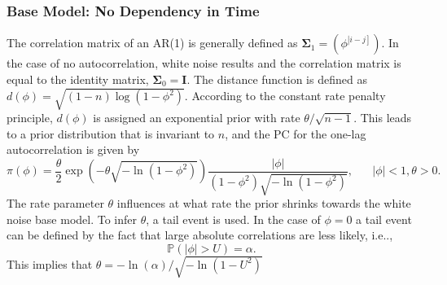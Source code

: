 \subsubsection*{Base Model: No Dependency in Time} 
The correlation matrix of an AR(1) is generally defined as $\pmb{\Sigma}_1=\left(\phi^{\left|i-j\right]}\right)$. In the case of no autocorrelation, white noise results and the correlation matrix is equal to the identity matrix, $\pmb{\Sigma}_0=\pmb{I}$. The distance function is defined as $d\left(\phi\right)=\sqrt{\left(1-n\right)\log\left(1-\phi^2\right)}$. According to the constant rate penalty principle, $d\left(\phi\right)$ is assigned an exponential prior with rate $\theta/\sqrt{n-1}$. This leads to a prior distribution that is invariant to $n$, and the PC for the one-lag autocorrelation is given by
\begin{equation}
    \pi\left(\phi\right)=\frac{\theta}{2}\exp\left(-\theta\sqrt{-\ln\left(1-\phi^2\right)}\right)\frac{|\phi|}{\left(1-\phi^2\right)\sqrt{-\ln\left(1-\phi^2\right)}}, \hspace{20pt} |\phi|<1,\theta>0.
\end{equation}
The rate parameter $\theta$ influences at what rate the prior shrinks towards the white noise base model. To infer $\theta$, a tail event is used. In the case of $\phi = 0$ a tail event can be defined by the fact that large absolute correlations are less likely, i.e..,
\begin{equation*}
    \mathbb{P}\left(|\phi|>U\right) = \alpha.
\end{equation*}
This implies that $\theta=-\ln\left(\alpha\right)/\sqrt{-\ln\left(1-U^2\right)}$
